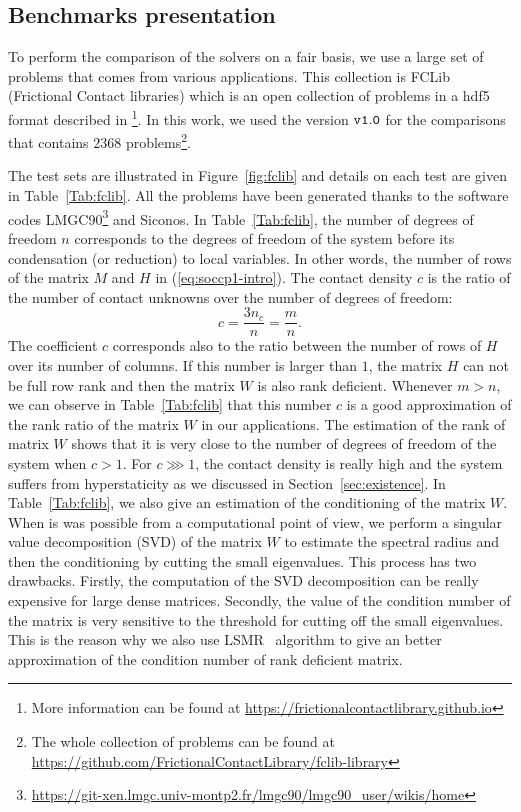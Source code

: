 \subsection{Benchmarks presentation}


To perform the comparison of the solvers on a fair basis, we use a large set of problems that comes from various applications. This collection is FCLib (Frictional Contact libraries)  which is an open collection of problems in a hdf5 format described in \citep{acary:hal-00945820}\footnote{More information can be found at \href{https://frictionalcontactlibrary.github.io}{https://frictionalcontactlibrary.github.io}}. In this work, we used the version $\tt v1.0$ for the comparisons that contains $2368$ problems\footnote{
The whole collection of problems can be found at \href{https://github.com/FrictionalContactLibrary/fclib-library}{https://github.com/FrictionalContactLibrary/fclib-library}}.

The test sets are illustrated in Figure~\ref{fig:fclib} and details on each test are given in Table~\ref{Tab:fclib}. All the problems have been generated thanks to the software codes LMGC90\footnote{\href{https://git-xen.lmgc.univ-montp2.fr/lmgc90/lmgc90_user/wikis/home}{https://git-xen.lmgc.univ-montp2.fr/lmgc90/lmgc90\_user/wikis/home}} and Siconos. In Table~\ref{Tab:fclib}, the number of degrees of freedom $n$ corresponds to the degrees of freedom of the system before its condensation (or reduction) to local variables. In other words, the number of rows of the matrix $M$ and $H$ in  (\ref{eq:soccp1-intro}). The contact density $c$ is the ratio of the number of contact unknowns over the number of degrees of freedom:
\begin{equation}
  \label{eq:fclib-1}
  c= \frac {3 n_c }{ n} = \frac {m} {n}.
\end{equation}
 The coefficient $c$ corresponds also to the ratio between the number of rows of $H$ over its number of columns. If this number is larger than $1$, the matrix $H$ can not be full row rank and then the matrix $W$ is also rank deficient. Whenever $m >n$, we can observe in Table~\ref{Tab:fclib} that  this number $c$ is a good approximation of the rank ratio of the matrix $W$ in our applications. The estimation of the rank of matrix $W$ shows that it is very close to the number of degrees of freedom of the system when $c>1$. For $c \ggg 1$, the contact density is really high and the system suffers from hyperstaticity as we discussed in Section~\ref{sec:existence}. In Table~\ref{Tab:fclib}, we also give an estimation of the conditioning of the matrix $W$. When is was possible from a computational point of view, we perform a singular value decomposition (SVD) of the matrix $W$ to estimate the spectral radius and then the conditioning by cutting the small eigenvalues. This process has two drawbacks. Firstly, the computation of the SVD decomposition can be really expensive for large dense matrices. Secondly, the value of the condition number of the matrix is very sensitive to the threshold for cutting off the small eigenvalues. This is the reason why we also use LSMR~\citep{Fong.Saunders_SISC2011} algorithm to give an better approximation of the condition number of rank deficient matrix. 


